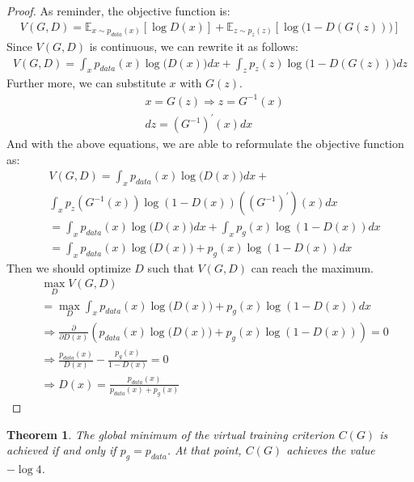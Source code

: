 \documentclass[10pt,twocolumn,letterpaper]{article}
\newtheorem{theorem}{Theorem}[section]
\begin{document}
\begin{proof}
As reminder, the objective function is: 
\begin{align*}
    V(G, D) = \mathbb{E}_{x \sim p_{data}(x)}[\log{D(x)}] + \mathbb{E}_{z \sim p_z(z)}[\log{\big(1 - D(G(z))\big)}]
\end{align*}
Since $V(G,D)$ is continuous, we can rewrite it as follows:
\begin{align*}
    V(G,D)=\int_xp_{data}(x)\log{\big(D(x)\big)}dx+\int_zp_z(z)\log{\big(1-D(G(z))\big)}dz
\end{align*}
Further more, we can substitute $x$ with $G(z)$.
\begin{align}
    &x = G(z) \Longrightarrow z = G^{-1}(x)\\
    & dz = (G^{-1})^{'}(x)dx
\end{align}
And with the above equations, we are able to reformulate the objective function as:
\begin{align*}
    &V(G,D)=\int_xp_{data}(x)\log{\big(D(x)\big)}dx+\\&\int_xp_z(G^{-1}(x))\log{(1-D(x))}((G^{-1})^{'})(x)dx \\
    &=\int_xp_{data}(x)\log{\big(D(x)\big)}dx+\int_xp_g(x)\log{(1-D(x))}dx\\
    &= \int_xp_{data}(x)\log{\big(D(x)\big)}+p_g(x)\log{(1-D(x))}dx
\end{align*}
Then we should optimize $D$ such that $V(G,D)$ can reach the maximum.
\begin{align*}
    &\max_DV(G,D)\\ &= \max_D\int_xp_{data}(x)\log{\big(D(x)\big)}+p_g(x)\log{(1-D(x))}dx\\
    &\Longrightarrow\frac{\partial}{\partial{D(x)}}(p_{data}(x)\log{\big(D(x)\big)}+p_g(x)\log{(1-D(x))}) = 0\\
    &\Longrightarrow \frac{p_{data}(x)}{D(x)} - \frac{p_g(x)}{1-D(x)} = 0\\
    &\Longrightarrow D(x) = \frac{p_{data}(x)}{p_{data}(x)+p_g(x)}
\end{align*}
\end{proof}

\begin{theorem}
The global minimum of the virtual training criterion $C(G)$ is achieved if and only if $p_g = p_{data}$. At that point, $C(G)$ achieves the value $-\log{4}$.\cite{goodfellow2014generative}
\end{theorem}
\end{document}
